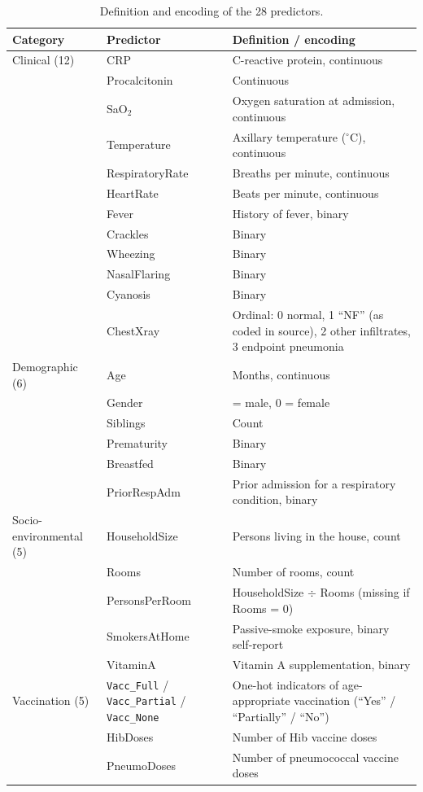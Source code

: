 \documentclass[a4paper,fleqn]{cas-dc}
\begin{document}
\begin{table}[tbp]
\caption{Definition and encoding of the 28 predictors.}
\label{tab:1}
\centering
{\scriptsize
\setlength{\tabcolsep}{3.2pt}
\begin{tabular}{>{\raggedright\arraybackslash}p{}>{\raggedright\arraybackslash}p{}>{\raggedright\arraybackslash}p{}}
\toprule
\textbf{Category} & \textbf{Predictor} & \textbf{Definition / encoding} \\
\midrule
Clinical (12) & CRP & C-reactive protein, continuous \\
 & Procalcitonin & Continuous \\
 & SaO$_{2}$ & Oxygen saturation at admission, continuous \\
 & Temperature & Axillary temperature ($^{\circ}$C), continuous \\
 & RespiratoryRate & Breaths per minute, continuous \\
 & HeartRate & Beats per minute, continuous \\
 & Fever & History of fever, binary \\
 & Crackles & Binary \\
 & Wheezing & Binary \\
 & NasalFlaring & Binary \\
 & Cyanosis & Binary \\
 & ChestXray & Ordinal: 0 normal, 1 “NF” (as coded in source), 2 other infiltrates, 3 endpoint pneumonia \\
\midrule
Demographic (6) & Age & Months, continuous \\
 & Gender & 1 = male, 0 = female \\
 & Siblings & Count \\
 & Prematurity & Binary \\
 & Breastfed & Binary \\
 & PriorRespAdm & Prior admission for a respiratory condition, binary \\
\midrule
Socio-environmental (5) & HouseholdSize & Persons living in the house, count \\
 & Rooms & Number of rooms, count \\
 & PersonsPerRoom & HouseholdSize $\div$ Rooms (missing if Rooms = 0) \\
 & SmokersAtHome & Passive-smoke exposure, binary self-report \\
 & VitaminA & Vitamin A supplementation, binary \\
\midrule
Vaccination (5) & \texttt{Vacc\_\allowbreak Full} / \texttt{Vacc\_\allowbreak Partial} / \texttt{Vacc\_\allowbreak None} & One-hot indicators of age-appropriate vaccination (“Yes” / “Partially” / “No”) \\
 & HibDoses & Number of Hib vaccine doses \\
 & PneumoDoses & Number of pneumococcal vaccine doses \\
\bottomrule
\end{tabular}}
\end{table}
\end{document}

